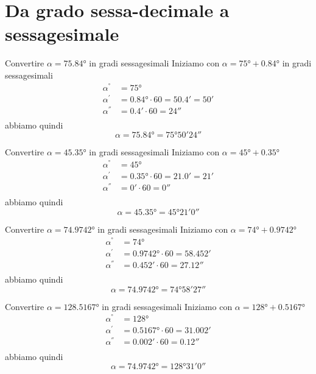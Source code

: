 \section{Da grado sessa-decimale a sessagesimale}
\tcbstartrecording
\begin{exercise}
	Convertire $\alpha=\ang{75.84}$ in gradi sessagesimali
	\tcblower
	Iniziamo con
	$\alpha=\ang{75}+\ang{0.84}$ in gradi sessagesimali
	\begin{align*}
	\alpha^{\si{\degree}}&=\ang{75}\\ 
	\alpha^{\si{\arcminute}}&=\ang{0.84}\cdot 60=\ang{;50.4;}=\ang{;50;}\\
	\alpha^{\si{\arcsecond}}&=\ang{;0.4;}\cdot 60=\ang{;;24}\\
	\end{align*}
	abbiamo quindi
	\[\alpha=\ang{75.84}=\ang{75;50;24}\]
\end{exercise}
\begin{exercise}
Convertire $\alpha=\ang{45.35}$ in gradi sessagesimali
	\tcblower
Iniziamo con 
$\alpha=\ang{45}+\ang{0.35}$
\begin{align*}
\alpha^{\si{\degree}}&=\ang{45}\\ 
\alpha^{\si{\arcminute}}&=\ang{0.35}\cdot 60=\ang{;21.0;}=\ang{;21;}\\
\alpha^{\si{\arcsecond}}&=\ang{;0;}\cdot 60=\ang{;;0}\\
\end{align*}
abbiamo quindi
\[\alpha=\ang{45.35}=\ang{45;21;0}\]
\end{exercise}
\begin{exercise}
	Convertire $\alpha=\ang{74.9742}$ in gradi sessagesimali
	\tcblower
	Iniziamo con 
	$\alpha=\ang{74}+\ang{0.9742}$
	\begin{align*}
	\alpha^{\si{\degree}}&=\ang{74}\\ 
	\alpha^{\si{\arcminute}}&=\ang{0.9742}\cdot 60=\ang{;58.452;}\\
	\alpha^{\si{\arcsecond}}&=\ang{;0.452;}\cdot 60=\ang{;;27.12}\\
	\end{align*}
	abbiamo quindi
	\[\alpha=\ang{74.9742}=\ang{74;58;27}\]
\end{exercise}
\begin{exercise}
	Convertire $\alpha=\ang{128.5167}$ in gradi sessagesimali
	\tcblower
	Iniziamo con 
	$\alpha=\ang{128}+\ang{0.5167}$
	\begin{align*}
	\alpha^{\si{\degree}}&=\ang{128}\\ 
	\alpha^{\si{\arcminute}}&=\ang{0.5167}\cdot 60=\ang{;31.002;}\\
	\alpha^{\si{\arcsecond}}&=\ang{;0.002;}\cdot 60=\ang{;;0.12}\\
	\end{align*}
	abbiamo quindi
	\[\alpha=\ang{74.9742}=\ang{128;31;0}\]
\end{exercise}
